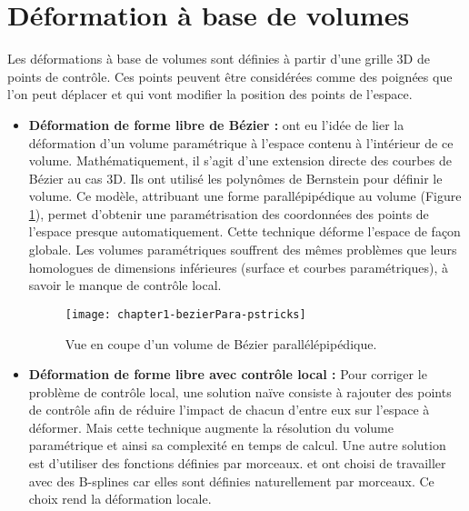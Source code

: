 \section{Déformation à base de volumes}

Les déformations à base de volumes sont définies à partir d'une grille 3D de
points de contrôle. Ces points peuvent être considérées comme des poignées que
l'on peut déplacer et qui vont modifier la position des points de l'espace.

\begin{itemize}

\item{\textbf{Déformation de forme libre de Bézier :}} \cite{SP86} ont eu
l'idée de lier la déformation d'un volume paramétrique à l'espace contenu à
l'intérieur de ce volume. Mathématiquement, il s'agit d'une extension directe
des courbes de Bézier au cas 3D. Ils ont utilisé les polynômes de Bernstein
pour définir le volume. Ce modèle, attribuant une forme parallépipédique au
volume (Figure \ref{SURPar}), permet d'obtenir une paramétrisation des
coordonnées des points de l'espace presque automatiquement. Cette technique
déforme l'espace de façon globale. Les volumes paramétriques souffrent des
mêmes problèmes que leurs homologues de dimensions inférieures (surface et
courbes paramétriques), à savoir le manque de contrôle local.

\begin{figure}[ht]
\begin{center}
  \texttt{[image: chapter1-bezierPara-pstricks]}
  \caption[Volume de Bézier parallélépipédique] {Vue en coupe d'un volume de
  Bézier parallélépipédique.}
  \label{SURPar}
\end{center}
\end{figure}

\item{\textbf{Déformation de forme libre avec contrôle local :}} Pour corriger
le problème de contrôle local, une solution naïve consiste à rajouter des
points de contrôle afin de réduire l'impact de chacun d'entre eux sur l'espace
à déformer. Mais cette technique augmente la résolution du volume paramétrique
et ainsi sa complexité en temps de calcul. Une autre solution est d'utiliser
des fonctions définies par morceaux. \cite{GP89} et \cite{Com89} ont choisi de
travailler avec des B-splines car elles sont définies naturellement par
morceaux. Ce choix rend la déformation locale.


\end{itemize}
